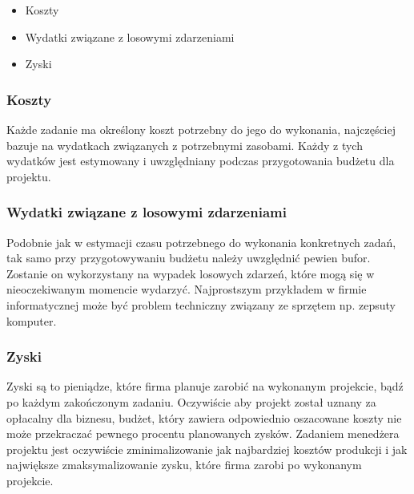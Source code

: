 \documentclass[oneside,polski,logo]{amuthesis}
\begin{document}
\begin{itemize}
	\item Koszty
	\item Wydatki związane z losowymi zdarzeniami
	\item Zyski
\end{itemize}

\subsubsection {Koszty}
Każde zadanie ma określony koszt potrzebny do jego do wykonania, najczęściej bazuje na wydatkach związanych z potrzebnymi zasobami. Każdy z tych wydatków jest estymowany i uwzględniany podczas przygotowania budżetu dla projektu.

\subsubsection {Wydatki związane z losowymi zdarzeniami}
Podobnie jak w estymacji czasu potrzebnego do wykonania konkretnych zadań, tak samo przy przygotowywaniu budżetu należy uwzględnić pewien bufor. Zostanie on wykorzystany na wypadek losowych zdarzeń, które mogą się w nieoczekiwanym momencie wydarzyć. Najprostszym przykładem w firmie informatycznej może być problem techniczny związany ze sprzętem np. zepsuty komputer.

\subsubsection {Zyski}
Zyski są to pieniądze, które firma planuje zarobić na wykonanym projekcie, bądź po każdym zakończonym zadaniu. Oczywiście aby projekt został uznany za opłacalny dla biznesu, budżet, który zawiera odpowiednio oszacowane koszty nie może przekraczać pewnego procentu planowanych zysków. Zadaniem menedżera projektu jest oczywiście zminimalizowanie jak najbardziej kosztów produkcji i jak największe zmaksymalizowanie zysku, które firma zarobi po wykonanym projekcie.
\end{document}
